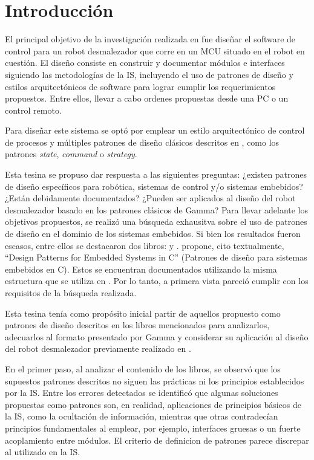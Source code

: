 \chapter{Introducción}

El principal objetivo de la investigación realizada en \cite{paperPomponio} fue diseñar el software de control para un robot desmalezador que corre en un \gls{MCU} situado en el robot en cuestión. El diseño consiste en construir y documentar módulos e interfaces siguiendo las metodologías de la \gls{IS}, incluyendo el uso de patrones de diseño y estilos arquitectónicos de software para lograr cumplir los requerimientos propuestos. Entre ellos, llevar a cabo ordenes propuestas desde una PC o un control remoto.

Para diseñar este sistema se optó por emplear un estilo arquitectónico de control de procesos \cite[pág. 27]{ShawGarlan1996} y múltiples patrones de diseño clásicos descritos en \cite{Gamma:1995:DPE:186897}, como los patrones \textit{state}, \textit{command} o \textit{strategy}.

Esta tesina se propuso dar respuesta a las siguientes preguntas: ¿existen patrones de diseño específicos para robótica, sistemas de control y/o sistemas embebidos? ¿Están debidamente documentados? ¿Pueden ser aplicados al diseño del robot desmalezador basado en los patrones clásicos de Gamma? Para llevar adelante los objetivos propuestos, se realizó una búsqueda exhausitva sobre el uso de patrones de diseño en el dominio de los sistemas embebidos. Si bien los resultados fueron escasos,  entre ellos se destacaron dos libros: \cite{douglass} y \cite{elecia-embedded}. \cite{douglass} propone, cito textualmente, ``Design Patterns for Embedded Systems in C'' (Patrones de diseño para sistemas embebidos en C). Estos se encuentran documentados utilizando la misma estructura que se utiliza en \cite{Gamma:1995:DPE:186897}. Por lo tanto, a primera vista pareció cumplir con los requisitos de la búsqueda realizada.

Esta tesina tenía como propósito inicial partir de aquellos propuesto como patrones de diseño descritos en los libros mencionados para analizarlos, adecuarlos al formato presentado por Gamma \cite{Gamma:1995:DPE:186897} y considerar su aplicación al diseño del robot desmalezador previamente realizado en \cite{paperPomponio}.

En el primer paso, al analizar el contenido de los libros, se observó que los supuestos patrones descritos no siguen las prácticas ni los principios establecidos por la IS. Entre los errores detectados se identificó que algunas soluciones propuestas como patrones son, en realidad, aplicaciones de principios básicos de la \gls{IS}, como la ocultación de información, mientras que otras contradecían principios fundamentales al emplear, por ejemplo, interfaces gruesas o un fuerte acoplamiento entre módulos. El criterio de definicion de patrones parece discrepar al utilizado en la \gls{IS}.

